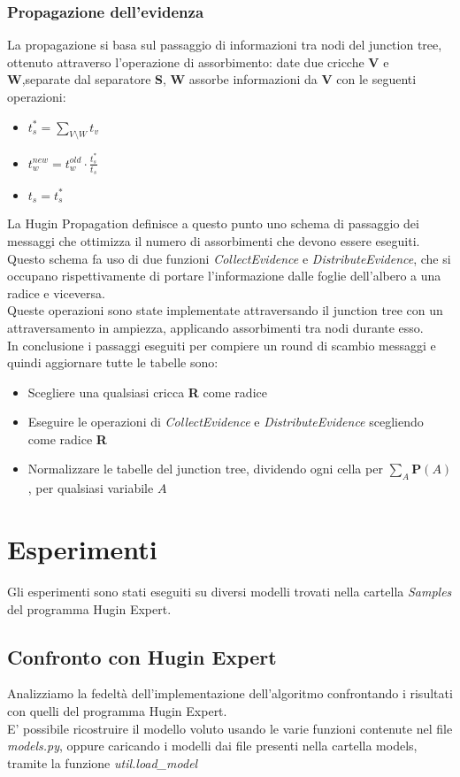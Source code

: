 \documentclass[a4paper]{article}
\begin{document}
\subsubsection{Propagazione dell'evidenza}
La propagazione si basa sul passaggio di informazioni tra nodi del junction tree, ottenuto attraverso l'operazione di assorbimento: date due cricche \textbf{V} e \textbf{W},separate dal separatore \textbf{S}, \textbf{W} assorbe informazioni da \textbf{V} con le seguenti operazioni:
\begin{itemize}
\item $t_s^* = \sum_{V\setminus W}t_v$
\item $t_w^{new}=t_w^{old}\cdot\frac{t_s^*}{t_s}$
\item $t_s = t_s^*$
\end{itemize} 
La Hugin Propagation definisce a questo punto uno schema di passaggio dei messaggi che ottimizza il numero di assorbimenti che devono essere eseguiti. Questo schema fa uso di due funzioni \emph{CollectEvidence} e \emph{DistributeEvidence}, che si occupano rispettivamente di portare l'informazione dalle foglie dell'albero a una radice e viceversa.\\
Queste operazioni sono state implementate attraversando il junction tree con un attraversamento in ampiezza, applicando assorbimenti tra nodi durante esso.\\
In conclusione i passaggi eseguiti per compiere un round di scambio messaggi e quindi aggiornare tutte le tabelle sono:
\begin{itemize}
\item Scegliere una qualsiasi cricca \textbf{R} come radice
\item Eseguire le operazioni di \emph{CollectEvidence} e \emph{DistributeEvidence} scegliendo come radice \textbf{R}
\item Normalizzare le tabelle del junction tree, dividendo ogni cella per $\sum_A \mathbf{P}(A)$, per qualsiasi variabile $A$
\end{itemize}

\section{Esperimenti}
Gli esperimenti sono stati eseguiti su diversi modelli trovati nella cartella \emph{Samples} del programma Hugin Expert.
\subsection{Confronto con Hugin Expert}
Analizziamo la fedeltà dell'implementazione dell'algoritmo confrontando i risultati con quelli del programma Hugin Expert.\\
E' possibile ricostruire il modello voluto usando le varie funzioni contenute nel file \emph{models.py}, oppure caricando i modelli dai file presenti nella cartella models, tramite la funzione \emph{util.load\_model}
\end{document}
